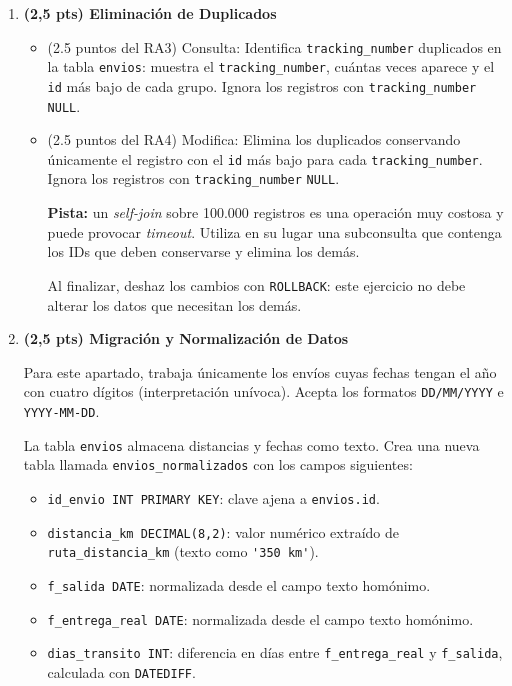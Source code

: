 \documentclass[a4paper,11pt]{article}
\begin{document}
\begin{Form}
\begin{enumerate}[leftmargin=*, label=\textbf{Pregunta \arabic*:}]
    
    \item \textbf{(2,5 pts) Eliminación de Duplicados}
    \begin{itemize}
        \item (2.5 puntos del RA3) Consulta: Identifica \texttt{tracking\_number} duplicados en la tabla \texttt{envios}: muestra el \texttt{tracking\_number}, cuántas veces aparece y el \texttt{id} más bajo de cada grupo. Ignora los registros con \texttt{tracking\_number} \texttt{NULL}.
        \item (2.5 puntos del RA4) Modifica: Elimina los duplicados conservando únicamente el registro con el \texttt{id} más bajo para cada \texttt{tracking\_number}. Ignora los registros con \texttt{tracking\_number} \texttt{NULL}.
        \par\medskip
        \textbf{Pista:} un \emph{self-join} sobre 100.000 registros es una operación muy costosa y puede provocar \emph{timeout}. Utiliza en su lugar una subconsulta que contenga los IDs que deben conservarse y elimina los demás.
        \par
        Al finalizar, deshaz los cambios con \texttt{ROLLBACK}: este ejercicio no debe alterar los datos que necesitan los demás.
    \end{itemize}
    

    \item \textbf{(2,5 pts) Migración y Normalización de Datos}

    Para este apartado, trabaja únicamente los envíos cuyas fechas tengan el año con cuatro dígitos (interpretación unívoca). Acepta los formatos \texttt{DD/MM/YYYY} e \texttt{YYYY-MM-DD}.

    La tabla \texttt{envios} almacena distancias y fechas como texto. Crea una nueva tabla llamada \texttt{envios\_normalizados} con los campos siguientes:
    \begin{itemize}
        \item \texttt{id\_envio INT PRIMARY KEY}: clave ajena a \texttt{envios.id}.
        \item \texttt{distancia\_km DECIMAL(8,2)}: valor numérico extraído de \texttt{ruta\_distancia\_km} (texto como \lstinline{'350 km'}).
        \item \texttt{f\_salida DATE}: normalizada desde el campo texto homónimo.
        \item \texttt{f\_entrega\_real DATE}: normalizada desde el campo texto homónimo.
        \item \texttt{dias\_transito INT}: diferencia en días entre \texttt{f\_entrega\_real} y \texttt{f\_salida}, calculada con \texttt{DATEDIFF}.
    \end{itemize}


\end{enumerate}
\end{Form}
\end{document}
